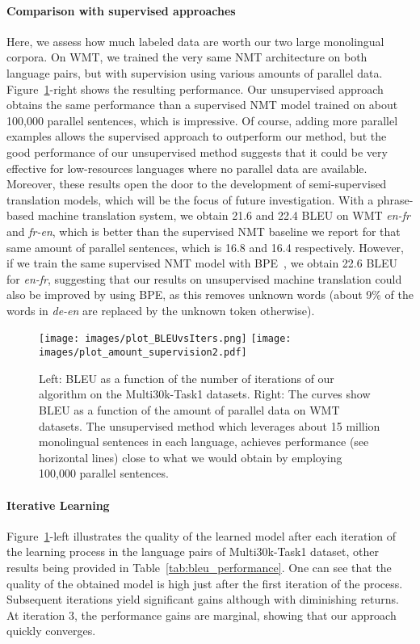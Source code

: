 \documentclass{article} \usepackage{iclr2018_conference,times}
\begin{document}
\paragraph{Comparison with supervised approaches} Here, we assess how much labeled data are worth our two large monolingual corpora. On WMT, we trained the very same NMT architecture on both language pairs, but with supervision using various amounts of parallel data. 
Figure~\ref{fig:plots}-right shows the resulting performance. Our unsupervised approach obtains the same performance than a supervised NMT model trained on about 100,000 parallel sentences, which is impressive. Of course, adding more parallel examples allows the supervised approach to outperform our method, but the good performance of our unsupervised method suggests that it could be very effective for low-resources languages where no parallel data are available. Moreover, these results open the door to the development of semi-supervised translation models, which will be the focus of future investigation.
With a phrase-based machine translation system, we obtain 21.6 and 22.4 BLEU on WMT \textit{en-fr} and \textit{fr-en}, which is better than the supervised NMT baseline we report for that same amount of parallel sentences, which is 16.8 and 16.4 respectively. However, if we train the same supervised NMT model with BPE~\citep{sennrich2015neural}, we obtain 22.6 BLEU for \textit{en-fr}, suggesting that our results on unsupervised machine translation could also be improved by using BPE, as this removes unknown words (about 9\% of the words in \textit{de-en} are replaced by the unknown token otherwise).

\begin{figure}[tb]
\begin{center}
\texttt{[image: images/plot\_BLEUvsIters.png]}
\texttt{[image: images/plot\_amount\_supervision2.pdf]}
\end{center}
\caption{Left: BLEU as a function of the number of iterations of our algorithm on the Multi30k-Task1 datasets. Right: The curves show BLEU as a function of the amount of parallel data on WMT datasets. The unsupervised method which leverages about 15 million monolingual sentences in each language, achieves performance (see horizontal lines) close to what we would obtain by employing 100,000 parallel sentences.}
\label{fig:plots}
\end{figure}

\paragraph{Iterative Learning} Figure~\ref{fig:plots}-left illustrates the quality of the learned model after each iteration of the learning process in the language pairs of Multi30k-Task1 dataset, other results being provided in Table~\ref{tab:bleu_performance}. One can see that the quality of the obtained model is high just after the first iteration of the process. Subsequent iterations yield significant gains although with diminishing returns. At iteration 3, the performance gains are marginal, showing that our approach quickly converges.
\end{document}
